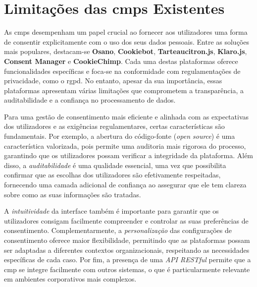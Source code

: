 
\section{Limitações das \acrshort{cmp}s Existentes}

As \acrshort{cmp}s desempenham um papel crucial ao fornecer aos utilizadores uma forma de consentir explicitamente com o uso dos seus dados pessoais. Entre as soluções mais populares, destacam-se \textbf{Osano}, \textbf{Cookiebot}, \textbf{Tarteaucitron.js}, \textbf{Klaro.js}, \textbf{Consent Manager} e \textbf{CookieChimp}. Cada uma destas plataformas oferece funcionalidades específicas e foca-se na conformidade com regulamentações de privacidade, como o \acrshort{rgpd}. No entanto, apesar da sua importância, essas plataformas apresentam várias limitações que comprometem a transparência, a auditabilidade e a confiança no processamento de dados.

Para uma gestão de consentimento mais eficiente e alinhada com as expectativas dos utilizadores e as exigências regulamentares, certas características são fundamentais. Por exemplo, a abertura do código-fonte (\textit{open source}) é uma característica valorizada, pois permite uma auditoria mais rigorosa do processo, garantindo que os utilizadores possam verificar a integridade da plataforma. Além disso, a \textit{auditabilidade} é uma qualidade essencial, uma vez que possibilita confirmar que as escolhas dos utilizadores são efetivamente respeitadas, fornecendo uma camada adicional de confiança ao assegurar que ele tem clareza sobre como as suas informações são tratadas.

A \textit{intuitividade} da interface também é importante para garantir que os utilizadores consigam facilmente compreender e controlar as suas preferências de consentimento. Complementarmente, a \textit{personalização} das configurações de consentimento oferece maior flexibilidade, permitindo que as plataformas possam ser adaptadas a diferentes contextos organizacionais, respeitando as necessidades específicas de cada caso. Por fim, a presença de uma \textit{API RESTful} permite que a \acrshort{cmp} se integre facilmente com outros sistemas, o que é particularmente relevante em ambientes corporativos mais complexos.

